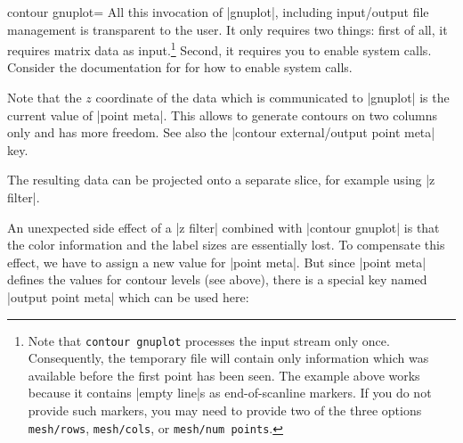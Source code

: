 {{\begin{plottype}[/pgfplots]{
    contour gnuplot=\textcolor{black}{}%
}
    All this invocation of |gnuplot|, including input/output file management is
    transparent to the user. It only requires two things: first of all, it
    requires matrix data as input.\footnote{Note that \texttt{contour gnuplot}
    processes the input stream only once. Consequently, the temporary file will
    contain only information which was available before the first point has
    been seen. The example above works because it contains |empty line|s as
    end-of-scanline markers. If you do not provide such markers, you may need
    to provide two of the three options \texttt{mesh/rows}, \texttt{mesh/cols},
    or \texttt{mesh/num points}.} Second, it requires you to enable system
    calls. Consider the documentation for  for how to
    enable system calls.

    Note that the $z$ coordinate of the data which is communicated to |gnuplot|
    is the current value of |point meta|. This allows to generate contours on
    two columns only and has more freedom. See also the
    |contour external/output point meta| key.

    The resulting data can be projected onto a separate slice, for example
    using |z filter|.
\pgfplotsexpensiveexample
\begin{codeexample}[]
\end{codeexample}

    An unexpected side effect of a |z filter| combined with |contour gnuplot|
    is that the color information and the label sizes are essentially lost. To
    compensate this effect, we have to assign a new value for |point meta|. But
    since |point meta| defines the values for contour levels (see above), there
    is a special key named |output point meta| which can be used here:


\end{plottype}}}
